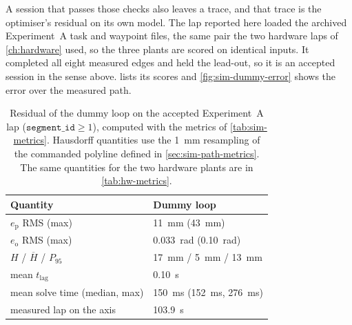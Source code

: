 A session that passes those checks also leaves a trace, and that trace
is the optimiser's residual on its own model. The lap reported here
loaded the archived Experiment~A task and waypoint files, the same pair
the two hardware laps of \cref{ch:hardware} used, so the three plants
are scored on identical inputs. It completed all eight measured edges and
held the lead-out, so it is an accepted session in the sense above.
 lists its scores and \cref{fig:sim-dummy-error}
shows the error over the measured path.

\begin{table}[htbp]
  \centering
  \caption[Residual of the dummy loop on the accepted Experiment~A
    lap]{%
    Residual of the dummy loop on the accepted Experiment~A lap
    ($\texttt{segment\_id}\ge 1$), computed with the metrics of
    \cref{tab:sim-metrics}. Hausdorff quantities use the
    \qty{1}{\milli\meter} resampling of the commanded polyline defined in
    \cref{sec:sim-path-metrics}. The same quantities for the two
    hardware plants are in \cref{tab:hw-metrics}.}
  \label{tab:sim-residual}
  \begin{tabularx}{\linewidth}{@{}Xl@{}}
    \toprule
    Quantity & Dummy loop \\
    \midrule
    $e_{\mathrm{p}}$ RMS (max)
      & \qty{11}{\milli\meter} (\qty{43}{\milli\meter}) \\
    $e_{\mathrm{o}}$ RMS (max)
      & \qty{0.033}{\radian} (\qty{0.10}{\radian}) \\
    $H$ / $\overline{H}$ / $P_{95}$
      & \qty{17}{\milli\meter} / \qty{5}{\milli\meter} /
        \qty{13}{\milli\meter} \\
    mean $t_{\mathrm{lag}}$
      & \qty{0.10}{\second} \\
    mean solve time (median, max)
      & \qty{150}{\milli\second} (\qty{152}{\milli\second},
        \qty{276}{\milli\second}) \\
    measured lap on the \ocs{} axis
      & \qty{103.9}{\second} \\
    \bottomrule
  \end{tabularx}
\end{table}

